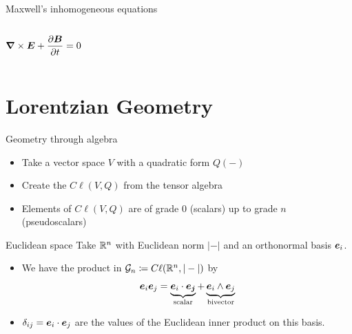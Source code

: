 \documentclass[aspectratio=169]{beamer}
\begin{document}
\begin{frame}{Maxwell's inhomogeneous equations}
\begin{columns}[c]
\begin{center}
    \vspace{-8mm}
    
    \small
    $$ \boldsymbol{\nabla} \times \boldsymbol{E} + \frac{\partial \boldsymbol{B}}{\partial t} = 0 $$ 
    \normalsize
    
    \end{center}
   
    
    \end{columns}
    
    
\end{frame}

\section{Lorentzian Geometry}

\begin{frame}{Geometry through algebra}
\vfill
\begin{itemize}
	\item Take a vector space $V$ with a quadratic form $Q(-)$
	\item Create the  $C\ell(V,Q)$ from the tensor algebra
	\item Elements of $C\ell(V,Q)$ are  of grade 0 (scalars) up to grade $n$ (pseudoscalars)
\end{itemize}
\vfill
\end{frame}

\begin{frame}{Euclidean space}
\vfill
Take $\mathbb{R}^n$ with Euclidean norm $|-|$ and an orthonormal basis $\boldsymbol{e}_i$.
\begin{itemize}
	\item We have the product in $\mathcal{G}_n\coloneqq C\ell(\mathbb{R}^n,|-|)$ by
	\[
	\boldsymbol{e}_i \boldsymbol{e}_j = \underbrace{\boldsymbol{e}_i \cdot \boldsymbol{e_j}}_{\textrm{scalar}} + \underbrace{\boldsymbol{e}_i \wedge \boldsymbol{e}_j}_{\textrm{bivector}}
	\]
	\item $\delta_{ij}=\boldsymbol{e}_i\cdot \boldsymbol{e}_j$ are the values of the Euclidean inner product on this basis.
\end{itemize}
\vfill
\end{frame}
\end{document}
